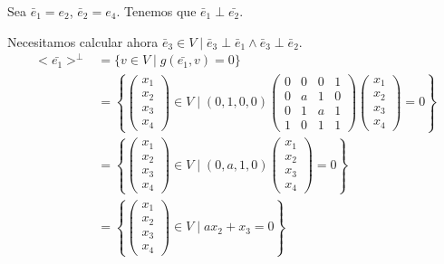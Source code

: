 \begin{ejercicio}
\begin{enumerate}
\begin{itemize}
            Sea $\bar{e}_1 = e_2$, $\bar{e}_2=e_4$. Tenemos que $\bar{e}_1\perp \bar{e_2}$.
            
            
            Necesitamos calcular ahora $\bar{e}_3\in V \mid \bar{e}_3\perp \bar{e}_1\land \bar{e}_3\perp \bar{e}_2$.
            \begin{equation*}\begin{split}
                <\bar{e_1}>^\perp &= \{v \in V \mid g(\bar{e_1},v) = 0\} \\
                &= \left\{ \left(\begin{array}{c}
                     x_1 \\ x_2 \\ x_3 \\ x_4
                \end{array} \right) \in V \mid (0, 1, 0, 0) \left(\begin{array}{cccc}
                    0 & 0 & 0 & 1 \\
                    0 & a & 1 & 0 \\
                    0 & 1 & a & 1 \\
                    1 & 0 & 1 & 1
                \end{array} \right) 
                \left(\begin{array}{c}
                     x_1 \\ x_2 \\ x_3 \\x_4
                \end{array} \right) = 0\right\} \\
                &= \left\{ \left(\begin{array}{c}
                     x_1 \\ x_2 \\ x_3 \\x_4
                \end{array} \right) \in V \mid (0, a, 1, 0)
                \left(\begin{array}{c}
                     x_1 \\ x_2 \\ x_3 \\ x_4
                \end{array} \right) = 0\right\} \\
                &= \left\{ \left(\begin{array}{c}
                     x_1 \\ x_2 \\ x_3 \\ x_4
                \end{array} \right) \in V \mid ax_2+x_3 = 0\right\}
            \end{split}\end{equation*}


\end{itemize}
\end{enumerate}
\end{ejercicio}
